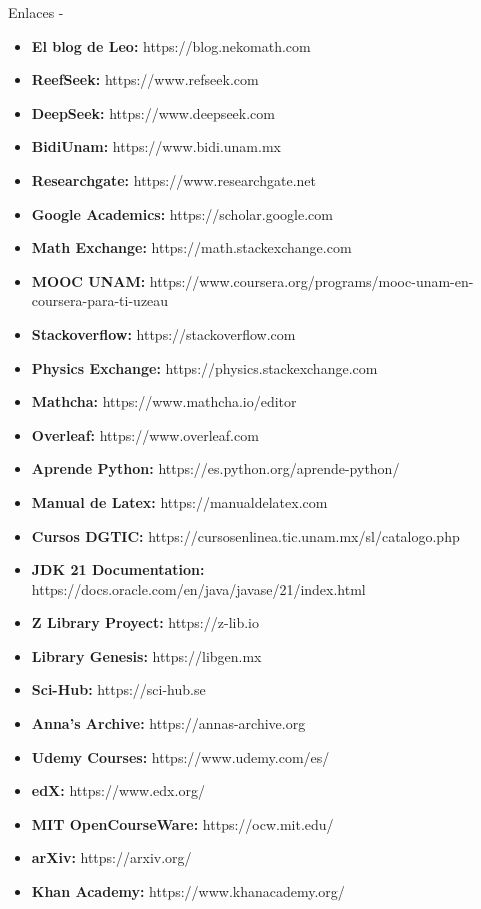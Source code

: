 \documentclass[11pt,letterpaper]{article}
\begin{document}
\begin{inciso}{Enlaces}
- \begin{itemize}
    \item \textbf{El blog de Leo:} https://blog.nekomath.com
    \item \textbf{ReefSeek:} https://www.refseek.com
    \item \textbf{DeepSeek:} https://www.deepseek.com
    \item \textbf{BidiUnam:} https://www.bidi.unam.mx
    \item \textbf{Researchgate:} https://www.researchgate.net
    \item \textbf{Google Academics:} https://scholar.google.com
    \item \textbf{Math Exchange:} https://math.stackexchange.com
    \item \textbf{MOOC UNAM:} https://www.coursera.org/programs/mooc-unam-en-coursera-para-ti-uzeau
    \item \textbf{Stackoverflow:} https://stackoverflow.com
    \item \textbf{Physics Exchange:} https://physics.stackexchange.com
    \item \textbf{Mathcha:} https://www.mathcha.io/editor
    \item \textbf{Overleaf:} https://www.overleaf.com
    \item \textbf{Aprende Python:} https://es.python.org/aprende-python/
    \item \textbf{Manual de Latex:} https://manualdelatex.com
    \item \textbf{Cursos DGTIC:} https://cursosenlinea.tic.unam.mx/sl/catalogo.php
    \item \textbf{JDK 21 Documentation:} https://docs.oracle.com/en/java/javase/21/index.html
    \item \textbf{Z Library Proyect:} https://z-lib.io
    \item \textbf{Library Genesis:} https://libgen.mx
    \item \textbf{Sci-Hub:} https://sci-hub.se
    \item \textbf{Anna's Archive:} https://annas-archive.org
    \item \textbf{Udemy Courses:} https://www.udemy.com/es/
    \item \textbf{edX:} https://www.edx.org/
    \item \textbf{MIT OpenCourseWare:} https://ocw.mit.edu/
    \item \textbf{arXiv:} https://arxiv.org/
    \item \textbf{Khan Academy:} https://www.khanacademy.org/

\end{itemize}
\end{inciso}
\end{document}
